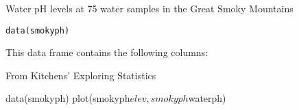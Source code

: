 \begin{Description}\relax
Water pH levels at 75 water samples in the Great Smoky Mountains
\end{Description}
\begin{Usage}
\begin{verbatim}data(smokyph)\end{verbatim}
\end{Usage}
\begin{Format}\relax
This data frame contains the following columns:
\end{Format}
\begin{Source}\relax
From Kitchens' Exploring Statistics
\end{Source}
\begin{Examples}
\begin{ExampleCode}
data(smokyph)
plot(smokyph$elev,smokyph$waterph)
\end{ExampleCode}
\end{Examples}

